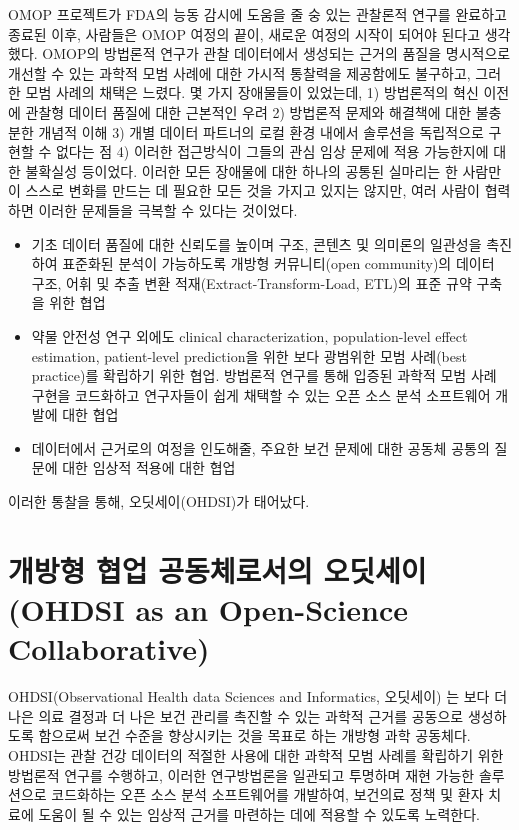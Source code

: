 \documentclass[11pt]{book}
\providecommand{\tightlist}{%
  \setlength{\itemsep}{0pt}\setlength{\parskip}{0pt}}
\theoremstyle{definition}
\theoremstyle{definition}
\theoremstyle{definition}
\theoremstyle{remark}
\begin{document}
OMOP 프로젝트가 FDA의 능동 감시에 도움을 줄 숭 있는 관찰론적 연구를
완료하고 종료된 이후, 사람들은 OMOP 여정의 끝이, 새로운 여정의 시작이
되어야 된다고 생각했다. OMOP의 방법론적 연구가 관찰 데이터에서 생성되는
근거의 품질을 명시적으로 개선할 수 있는 과학적 모범 사례에 대한 가시적
통찰력을 제공함에도 불구하고, 그러한 모범 사례의 채택은 느렸다. 몇 가지
장애물들이 있었는데, 1) 방법론적의 혁신 이전에 관찰형 데이터 품질에 대한
근본적인 우려 2) 방법론적 문제와 해결책에 대한 불충분한 개념적 이해 3)
개별 데이터 파트너의 로컬 환경 내에서 솔루션을 독립적으로 구현할 수
없다는 점 4) 이러한 접근방식이 그들의 관심 임상 문제에 적용 가능한지에
대한 불확실성 등이었다. 이러한 모든 장애물에 대한 하나의 공통된 실마리는
한 사람만이 스스로 변화를 만드는 데 필요한 모든 것을 가지고 있지는
않지만, 여러 사람이 협력하면 이러한 문제들을 극복할 수 있다는 것이었다.

\begin{itemize}
\tightlist
\item
  기초 데이터 품질에 대한 신뢰도를 높이며 구조, 콘텐츠 및 의미론의
  일관성을 촉진하여 표준화된 분석이 가능하도록 개방형 커뮤니티(open
  community)의 데이터 구조, 어휘 및 추출 변환
  적재(Extract-Transform-Load, ETL)의 표준 규약 구축을 위한 협업
\item
  약물 안전성 연구 외에도 clinical characterization, population-level
  effect estimation, patient-level prediction을 위한 보다 광범위한 모범
  사례(best practice)를 확립하기 위한 협업. 방법론적 연구를 통해 입증된
  과학적 모범 사례 구현을 코드화하고 연구자들이 쉽게 채택할 수 있는 오픈
  소스 분석 소프트웨어 개발에 대한 협업
\item
  데이터에서 근거로의 여정을 인도해줄, 주요한 보건 문제에 대한 공동체
  공통의 질문에 대한 임상적 적용에 대한 협업
\end{itemize}

이러한 통찰을 통해, 오딧세이(OHDSI)가 태어났다.

\section{개방형 협업 공동체로서의 오딧세이 (OHDSI as an Open-Science
Collaborative)}\label{----ohdsi-as-an-open-science-collaborative}

OHDSI(Observational Health data Sciences and Informatics, 오딧세이) 는
보다 더 나은 의료 결정과 더 나은 보건 관리를 촉진할 수 있는 과학적
근거를 공동으로 생성하도록 함으로써 보건 수준을 향상시키는 것을 목표로
하는 개방형 과학 공동체다. \citep{Hripcsak2015} OHDSI는 관찰 건강
데이터의 적절한 사용에 대한 과학적 모범 사례를 확립하기 위한 방법론적
연구를 수행하고, 이러한 연구방법론을 일관되고 투명하며 재현 가능한
솔루션으로 코드화하는 오픈 소스 분석 소프트웨어를 개발하여, 보건의료
정책 및 환자 치료에 도움이 될 수 있는 임상적 근거를 마련하는 데에 적용할
수 있도록 노력한다.
\end{document}
